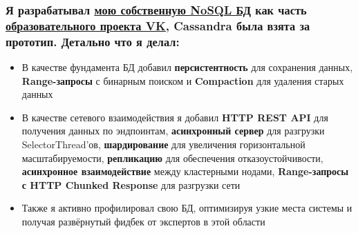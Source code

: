 \documentclass[11pt]{article}
\begin{document}
\subsubsection{Я разрабатывал \href{https://github.com/polis-vk/2022-highload-dht/tree/main/src/main/java/ok/dht/test/kovalenko}{\underline{мою собственную NoSQL БД}} как часть \href{https://education.vk.company/}{\underline{образовательного проекта VK}}, Cassandra была взята за прототип. Детально что я делал:}
\begin{itemize}
    \item В качестве фундамента БД добавил \textbf{персистентность} для сохранения данных, \textbf{Range-запросы} с бинарным поиском и \textbf{Compaction} для удаления старых данных
    \item В качестве сетевого взаимодействия я добавил \textbf{HTTP REST API} для получения данных по эндпоинтам, \textbf{асинхронный сервер} для разгрузки SelectorThread'ов, \textbf{шардирование} для увеличения горизонтальной масштабируемости, \textbf{репликацию} для обеспечения отказоустойчивости, \textbf{асинхронное взаимодействие} между кластерными нодами, \textbf{Range-запросы с HTTP Chunked Response} для разгрузки сети
    \item Также я активно профилировал свою БД, оптимизируя узкие места системы и получая развёрнутый фидбек от экспертов в этой области
\end{itemize}
\end{document}
